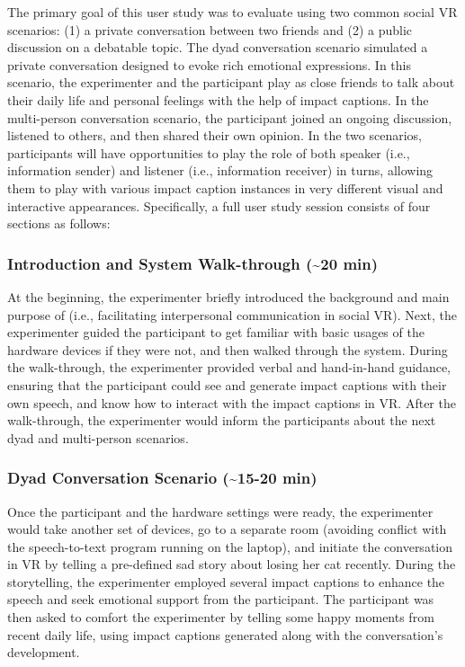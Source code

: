 
The primary goal of this user study was to evaluate \system{} using two common social VR scenarios: (1) a private conversation between two friends and (2) a public discussion on a debatable topic.
The dyad conversation scenario simulated a private conversation designed to evoke rich emotional expressions.
In this scenario, the experimenter and the participant play as close friends to talk about their daily life and personal feelings with the help of impact captions. 
In the multi-person conversation scenario, the participant joined an ongoing discussion, listened to others, and then shared their own opinion.
In the two scenarios, participants will have opportunities to play the role of both speaker (i.e., information sender) and listener (i.e., information receiver) in turns, allowing them to play with various impact caption instances in very different visual and interactive appearances.
Specifically, a full user study session consists of four sections as follows: 

\subsubsection{Introduction and System Walk-through (\textasciitilde20 min)}
At the beginning, the experimenter briefly introduced the background and main purpose of \system{} (i.e., facilitating interpersonal communication in social VR). Next, the experimenter guided the participant to get familiar with basic usages of the hardware devices if they were not, and then walked through the \system{} system. During the walk-through, the experimenter provided verbal and hand-in-hand guidance, ensuring that the participant could see and generate impact captions with their own speech, and know how to interact with the impact captions in VR. After the walk-through, the experimenter would inform the participants about the next dyad and multi-person scenarios.

\subsubsection{Dyad Conversation Scenario (\textasciitilde15-20 min)}
Once the participant and the hardware settings were ready, the experimenter would take another set of devices, go to a separate room (avoiding conflict with the speech-to-text program running on the laptop), and initiate the conversation in VR by telling a pre-defined sad story about losing her cat recently. During the storytelling, the experimenter employed several impact captions to enhance the speech and seek emotional support from the participant. The participant was then asked to comfort the experimenter by telling some happy moments from recent daily life, using impact captions generated along with the conversation's development. 

